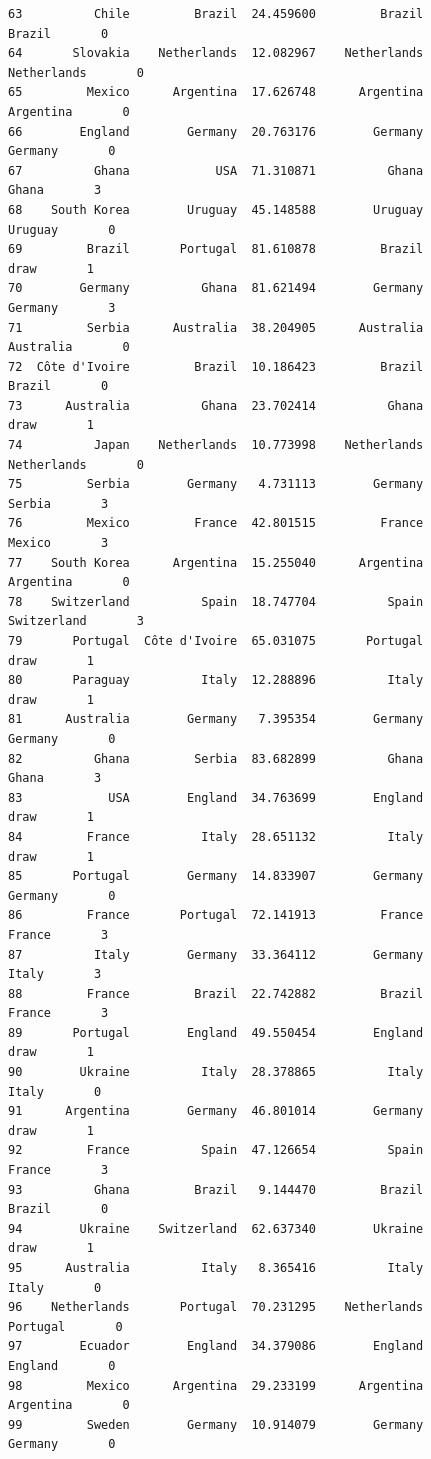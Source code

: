 \documentclass[12pt,fleqn]{article}\usepackage{common}
\begin{document}
\begin{verbatim}
63          Chile         Brazil  24.459600         Brazil         Brazil       0
64       Slovakia    Netherlands  12.082967    Netherlands    Netherlands       0
65         Mexico      Argentina  17.626748      Argentina      Argentina       0
66        England        Germany  20.763176        Germany        Germany       0
67          Ghana            USA  71.310871          Ghana          Ghana       3
68    South Korea        Uruguay  45.148588        Uruguay        Uruguay       0
69         Brazil       Portugal  81.610878         Brazil           draw       1
70        Germany          Ghana  81.621494        Germany        Germany       3
71         Serbia      Australia  38.204905      Australia      Australia       0
72  Côte d'Ivoire         Brazil  10.186423         Brazil         Brazil       0
73      Australia          Ghana  23.702414          Ghana           draw       1
74          Japan    Netherlands  10.773998    Netherlands    Netherlands       0
75         Serbia        Germany   4.731113        Germany         Serbia       3
76         Mexico         France  42.801515         France         Mexico       3
77    South Korea      Argentina  15.255040      Argentina      Argentina       0
78    Switzerland          Spain  18.747704          Spain    Switzerland       3
79       Portugal  Côte d'Ivoire  65.031075       Portugal           draw       1
80       Paraguay          Italy  12.288896          Italy           draw       1
81      Australia        Germany   7.395354        Germany        Germany       0
82          Ghana         Serbia  83.682899          Ghana          Ghana       3
83            USA        England  34.763699        England           draw       1
84         France          Italy  28.651132          Italy           draw       1
85       Portugal        Germany  14.833907        Germany        Germany       0
86         France       Portugal  72.141913         France         France       3
87          Italy        Germany  33.364112        Germany          Italy       3
88         France         Brazil  22.742882         Brazil         France       3
89       Portugal        England  49.550454        England           draw       1
90        Ukraine          Italy  28.378865          Italy          Italy       0
91      Argentina        Germany  46.801014        Germany           draw       1
92         France          Spain  47.126654          Spain         France       3
93          Ghana         Brazil   9.144470         Brazil         Brazil       0
94        Ukraine    Switzerland  62.637340        Ukraine           draw       1
95      Australia          Italy   8.365416          Italy          Italy       0
96    Netherlands       Portugal  70.231295    Netherlands       Portugal       0
97        Ecuador        England  34.379086        England        England       0
98         Mexico      Argentina  29.233199      Argentina      Argentina       0
99         Sweden        Germany  10.914079        Germany        Germany       0
\end{verbatim}
\end{document}
